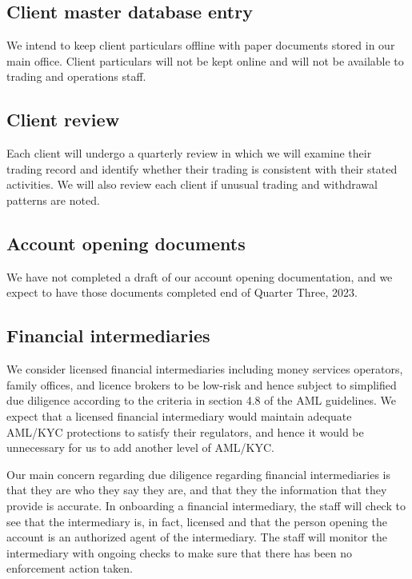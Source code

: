 \subsection{Client master database entry}
We intend to keep client particulars offline with paper documents
stored in our main office.  Client particulars will not be kept online
and will not be available to trading and operations staff.

\subsection{Client review}
Each client will undergo a quarterly review in which we will examine
their trading record and identify whether their trading is
consistent with their stated activities.  We will also review each
client if unusual trading and withdrawal patterns are noted.

\subsection{Account opening documents}
We have not completed a draft of our account opening documentation, and
we expect to have those documents completed end of Quarter Three, 2023.

\subsection{Financial intermediaries}

We consider licensed financial intermediaries including money services
operators, family offices, and licence brokers to be low-risk and
hence subject to simplified due diligence according to the criteria in
section 4.8 of the AML guidelines.  We expect that a
licensed financial intermediary would maintain adequate AML/KYC
protections to satisfy their regulators, and hence it would be
unnecessary for us to add another level of AML/KYC.

Our main concern regarding due diligence regarding financial
intermediaries is that they are who they say they are, and that they
the information that they provide is accurate.  In onboarding a
financial intermediary, the staff will check to see that the
intermediary is, in fact, licensed and that the person opening the
account is an authorized agent of the intermediary.  The staff will
monitor the intermediary with ongoing checks to make sure that there
has been no enforcement action taken.

